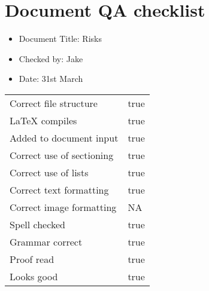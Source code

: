 \documentclass[14pt]{article}
\begin{document}
\section*{Document QA checklist}
\Large
\begin{itemize}
\item Document Title: Risks
\item Checked by: Jake
\item Date: 31st March
\end{itemize}
\Large
\begin{tabularx}{\textwidth}{ X | X }
Correct file structure &  true\\
\LaTeX \hspace{4pt} compiles & true\\
Added to document input & true\\
Correct use of sectioning & true\\
Correct use of lists & true\\
Correct text formatting & true\\
Correct image formatting & NA\\
Spell checked & true\\
Grammar correct & true\\
Proof read & true\\
Looks good & true\\
\end{tabularx}
\end{document}
